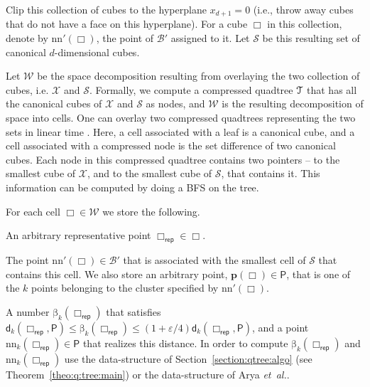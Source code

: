 \documentclass[12pt]{article}
\newcommand{\BFS}{\textsf{BFS}\xspace}
\theoremstyle{remark}{\theorembodyfont{\rm} \newtheorem{remark}[theorem]{Remark}}
\newcommand{\thmref}[1]{Theorem~\ref{theo:#1}}
\newcommand{\secref}[1]{Section~\ref{section:#1}}
\newcommand{\pth}[2][\!]{#1\left({#2}\right)}
\newcommand{\distPk}[3]{\mathsf{d}_{#3}\pth{#2,#1}}
\newcommand{\eps}{{\varepsilon}}\newcommand{\divides}{|}
\newcommand{\etal}{\textit{et~al.}\xspace}
\newcommand{\PntSet}{\mathsf{P}}
\newcommand{\BallSet}{\mathcal{B}}
\newcommand{\CellSetA}{\mathcal{X}}
\newcommand{\CellSetAVD}{\mathcal{W}}
\newcommand{\CellSetC}{\mathcal{S}}
\newcommand{\cellA}{\mathsf{\Box}}
\newcommand{\mapped}[1]{#1'}
\newcommand{\repres}[1]{#1_{\mathsf{rep}}}
\newcommand{\knnrepX}[1]{\mathrm{nn}_k\pth{#1}}
\newcommand{\QTree}{\EuScript{T}\index{quadtree}}
\newcommand{\repX}[1]{\mathrm{nn'}\pth{#1}}
\newcommand{\pntrepX}[1]{\mathbf{p}\pth{#1}}
\newcommand{\adknn}[1]{\mathrm{\beta}_k\pth{#1}}
\begin{document}
\begin{compactenum}[(A)]
    
    Clip this collection of cubes to the hyperplane $x_{d+1} = 0$
    (i.e., throw away cubes that do not have a face on this
    hyperplane). For a cube $\cellA$ in this collection, denote by
    $\repX{\cellA}$, the point of $\mapped{\BallSet}$ assigned to it.
    Let $\CellSetC$ be this resulting set of canonical $d$-dimensional
    cubes.
    
    
    \item Let $\CellSetAVD$ be the space decomposition resulting from
    overlaying the two collection of cubes, i.e. $\CellSetA$ and
    $\CellSetC$.  Formally, we compute a compressed quadtree $\QTree$
    that has all the canonical cubes of $\CellSetA$ and $\CellSetC$ as
    nodes, and $\CellSetAVD$ is the resulting decomposition of space
    into cells. One can overlay two compressed quadtrees representing
    the two sets in linear time \cite{bhst-sqgqi-10, h-gaa-11}.  Here,
    a cell associated with a leaf is a canonical cube, and a cell
    associated with a compressed node is the set difference of two
    canonical cubes. Each node in this compressed quadtree contains
    two pointers -- to the smallest cube of $\CellSetA$, and 
    to the smallest cube of $\CellSetC$, that contains it. This
    information can be computed by doing a \BFS on the tree.
    
    For each cell $\cellA \in \CellSetAVD$ we store the following.
    \begin{compactenum}[\qquad(I)]
        \item An arbitrary representative point $\repres{\cellA} \in
        \cellA$.
        
        \item The point $\repX{\cellA} \in \mapped{\BallSet}$ that is
        associated with the smallest cell of $\CellSetC$ that contains
        this cell. We also store an arbitrary point, $\pntrepX{\cellA}
        \in \PntSet$, that is one of the $k$ points belonging to the
        cluster specified by $\repX{\cellA}$.
        
        \item A number $\adknn{\repres{\cellA}}$ that satisfies
        $\distPk{\PntSet}{\repres{\cellA}}{k} \leq
        \adknn{\repres{\cellA}} \leq
        (1+\eps/4)\distPk{\PntSet}{\repres{\cellA}}{k}$, and a point
        $\knnrepX{\repres{\cellA}} \in \PntSet$ that realizes this
        distance. In order to compute $\adknn{\repres{\cellA}}$ and
        $\knnrepX{\repres{\cellA}}$ use the data-structure of
        \secref{qtree:algo} (see \thmref{q:tree:main}) or
        the data-structure of Arya \etal \cite{amm-sttas-05}.
    \end{compactenum}
\end{compactenum}
\end{document}
